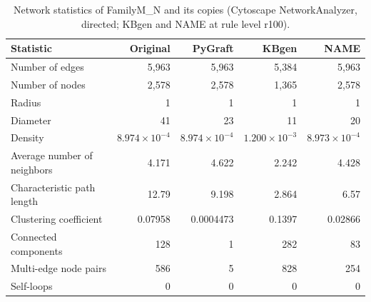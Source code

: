 \begin{table}[t]
\centering
\caption{Network statistics of FamilyM\_N and its copies (Cytoscape NetworkAnalyzer, directed; KBgen and NAME at rule level r100).}
\label{tab:cytoscape_FamilyM_N}
\begin{tabular}{lrrrr}
\toprule
Statistic & Original & PyGraft & KBgen & NAME \\
\midrule
Number of edges & 5{,}963 & 5{,}963 & 5{,}384 & 5{,}963 \\
Number of nodes & 2{,}578 & 2{,}578 & 1{,}365 & 2{,}578 \\
Radius & 1 & 1 & 1 & 1 \\
Diameter & 41 & 23 & 11 & 20 \\
Density & $8.974\times10^{-4}$ & $8.974\times10^{-4}$ & $1.200\times10^{-3}$ & $8.973\times10^{-4}$ \\
Average number of neighbors & 4.171 & 4.622 & 2.242 & 4.428 \\
Characteristic path length & 12.79 & 9.198 & 2.864 & 6.57 \\
Clustering coefficient & 0.07958 & 0.0004473 & 0.1397 & 0.02866 \\
Connected components & 128 & 1 & 282 & 83 \\
Multi-edge node pairs & 586 & 5 & 828 & 254 \\
Self-loops & 0 & 0 & 0 & 0 \\
\bottomrule
\end{tabular}
\end{table}

